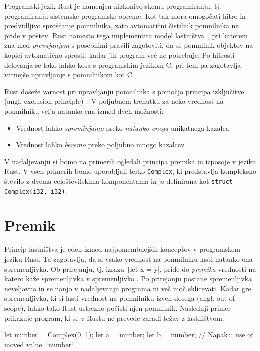 Programski jezik Rust je namenjen nizkonivojskemu programiranju, tj. programiranju sistemske programske opreme. Kot tak mora omogočati hitro in predvidljivo sproščanje pomnilnika, zato avtomatični čistilnik pomnilnika ne pride v poštev. Rust namesto tega implementira model lastništva~\cite{klabnik2023rust}, pri katerem zna med \textit{prevajanjem} s posebnimi pravili zagotoviti, da se pomnilnik objektov na kopici avtomatično sprosti, kadar jih program več ne potrebuje. Po hitrosti delovanja se tako lahko kosa s programskim jezikom C, pri tem pa zagotavlja varnejše upravljanje s pomnilnikom kot C.

Rust doseže varnost pri upravljanju pomnilnika s pomočjo principa izključitve (angl. exclusion
principle)~\cite{jung2020understanding}. V poljubnem trenutku za neko vrednost na pomnilniku velja natanko ena izmed dveh možnosti:

\begin{itemize}
	\itemsep 0em
	\item Vrednost lahko \textit{spreminjamo} preko \textit{natanko enega} unikatnega kazalca
	\item Vrednost lahko \textit{beremo} preko poljubno mnogo kazalcev
\end{itemize}

V nadaljevanju si bomo na primerih ogledali principa premika in izposoje v jeziku Rust. V vseh primerih bomo uporabljali terko \texttt{Complex}, ki predstavlja kompleksno število z dvema celoštevilskima komponentama in je definirana kot \texttt{struct Complex(i32, i32)}.

\section{Premik}

Princip lastništva je eden izmed najpomembnejših konceptov v programskem jeziku Rust. Ta zagotavlja, da si vsako vrednost na pomnilniku lasti natanko ena spremenljivka. Ob prirejanju, tj. izrazu \texttt|let x = y|, pride do \textit{premika} vrednosti na katero kaže spremenljivka  v spremenljivko . Po prirejanju postane spremenljivka  neveljavna in se nanjo v nadaljevanju programa ni več moč sklicevati. Kadar gre spremenljivka, ki si lasti vrednost na pomnilniku izven dosega (angl. out-of-scope), lahko tako Rust ustrezno počisti njen pomnilnik. Naslednji primer prikazuje program, ki se v Rustu ne prevede zaradi težav z lastništvom.

\begin{rust-failure}
let number = Complex(0, 1);
let a = number;
let b = number;  // Napaka: use of moved value: `number`
\end{rust-failure}

